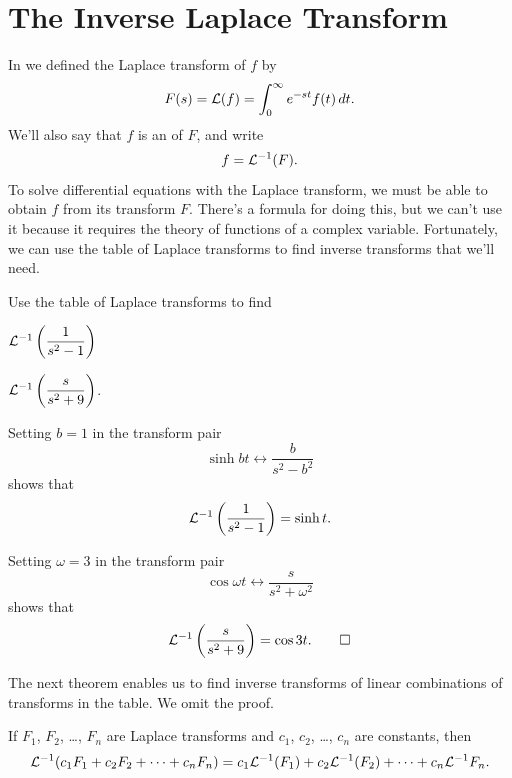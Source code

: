 \section{The Inverse Laplace Transform}\label{sec:inverse_laplace}


In  we defined the Laplace transform
of
$f$ by
\[
F(s)={\mathcal L}(f)=\int_0^\infty e^{-st}f(t)\,dt.
\]
We'll also say that $f$ is an  of
$F$, and write
\[
f={\mathcal L}^{-1}(F).
\]
To solve differential equations with the Laplace transform, we
must be able to obtain $f$ from its transform $F$. There's a formula
for doing this, but we can't use it because it requires the theory of
functions of a complex variable. Fortunately, we can use the table of
Laplace transforms to find inverse transforms that we'll need.

\begin{example}\label{example:8.2.1}
Use the table of Laplace
transforms to find
\begin{alist}[columns=2,list-offset=6em]
\item${\mathcal L}^{-1}\left(\dfrac{1}{s^2-1}\right)$
\qquad\qquad{}
\item${\mathcal L}^{-1}\left(\dfrac{s}{s^2+9}\right)$.
\end{alist}
\end{example}

\begin{alistSolution}
\item
Setting $b=1$ in  the transform pair
\[
\sinh bt\leftrightarrow \frac{b}{s^2-b^2}
\]
shows that
\[
{\mathcal L}^{-1}\left(\frac{1}{s^2-1}\right)=\sinh t.
\]

\item
Setting $\omega=3$ in  the transform pair
\[
\cos\omega t\leftrightarrow\frac{s}{s^2+\omega^2}
\]
shows that
\[
{\mathcal L}^{-1}\left(\frac{s}{s^2+9}\right)=\cos3t.\qedhere
\]
\end{alistSolution}

The next theorem enables us to find inverse transforms of linear
combinations of transforms in the table. We omit the proof.

\begin{theorem}\label{thmtype:8.2.1}
If $F_1$, $F_2$, \dots, $F_n$ are Laplace transforms and
$c_1$, $c_2$, \dots, $c_n$ are constants, then
\[
{\mathcal L}^{-1}(c_1F_1+c_2F_2+\cdots+c_nF_n)=c_1{\mathcal L}^{-1}(F_1)+c_2{\mathcal L}^{-1}(F_2)+\cdots+c_n{\mathcal L}^{-1}F_n.
\]
\end{theorem}

